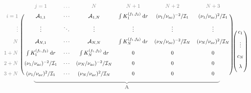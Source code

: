 \documentclass[twocolumn,twocolappendix]{aastex6}
\begin{document}
\begin{figure*}
    \begin{equation} \label{eq:OLA-mat}
        \begin{blockarray}{rcccccc}
               & {\color{gray} j=1}  & {\color{gray} \ldots} & {\color{gray} N} & {\color{gray} N+1} & {\color{gray} N+2} & {\color{gray} N+3} \\[0.5em]
            \begin{block}{r(cccccc)}
              {\color{gray} i=1} & \mathcal{A}_{1,1}  & \cdots & \mathcal{A}_{1,N}  & \int K_1^{(f_1, f_2)} \; \text{d}r & (\nu_1/\nu_{ac})^{-2}/\mathcal{I}_1  &  (\nu_1/\nu_{ac})^{2}/\mathcal{I}_1  \\[0.75em]
         {\color{gray} \vdots} & \vdots             & \ddots & \vdots             & \vdots &  \vdots  &  \vdots  \\[0.75em]
              {\color{gray} N} & \mathcal{A}_{N,1}  & \cdots & \mathcal{A}_{N,N}  & \int K_N^{(f_1, f_2)} \; \text{d}r &  (\nu_N/\nu_{ac})^{-2}/\mathcal{I}_N  &  (\nu_N/\nu_{ac})^{2}/\mathcal{I}_N  \\[0.75em]
            {\color{gray} 1+N} & \int K_1^{(f_1, f_2)} \; \text{d}r & \cdots & \int K_N^{(f_1, f_2)} \; \text{d}r &  0  & 0  & 0  \\[0.75em]
            {\color{gray} 2+N} & (\nu_1/\nu_{ac})^{-2}/\mathcal{I}_1  &  \cdots   &  (\nu_N/\nu_{ac})^{-2}/\mathcal{I}_N  & 0  & 0  & 0  \\[0.75em]
            {\color{gray} 3+N} & (\nu_1/\nu_{ac})^{2} /\mathcal{I}_1  &  \cdots   &  (\nu_N/\nu_{ac})^{2}/\mathcal{I}_N   & 0  & 0  & 0  \\%
            \end{block}\\[-5mm]
            & \BAmulticolumn{6}{c}{\color{gray} \underbrace{\hspace*{12.25cm}}_{\textstyle \mathbf{\vphantom{x}A\vphantom{b}}}} \\%
        \end{blockarray} \hspace*{1mm}
        \begin{blockarray}{c}
            \\[0.75em]
            \begin{block}{(c)}
                c_1 \\[0.75em]
                \vdots \\[0.75em]
                c_N \\[0.75em]
                \lambda \\[0.75em]

\end{block}
\end{blockarray}
\end{equation}
\end{figure*}
\end{document}

